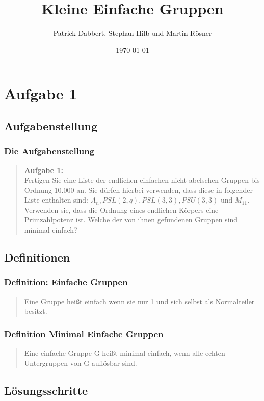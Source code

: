 \documentclass{beamer}
\title{Kleine Einfache Gruppen}
\author{Patrick Dabbert, Stephan Hilb und Martin R\"osner}
\date{\today}
\begin{document}
\begin{frame}
	\titlepage
\end{frame}


\section{Aufgabe 1}
\subsection{Aufgabenstellung}

\begin{frame}
	\frametitle{Die Aufgabenstellung}
	\begin{quote}
	\textbf{Aufgabe 1:}\\
	Fertigen Sie eine Liste der endlichen einfachen nicht-abelschen Gruppen bis Ordnung 10.000 an.
	Sie dürfen hierbei verwenden, dass diese in folgender Liste enthalten sind: $A_n, PSL(2,q), PSL(3,3),
	PSU(3,3)$ und $M_{11}$. Verwenden sie, dass die Ordnung eines endlichen Körpers eine Primzahlpotenz ist.
	Welche der von ihnen gefundenen Gruppen sind minimal einfach?
		 
	\end{quote}
\end{frame}

\subsection{Definitionen}


\begin{frame}
	\frametitle{Definition: Einfache Gruppen}
	\begin{quote}
	 Eine Gruppe heißt einfach wenn sie nur 1 und sich selbst als Normalteiler besitzt.
		 
	\end{quote}
\end{frame}
\begin{frame}
	\frametitle{Definition Minimal Einfache Gruppen}
	\begin{quote}
	 Eine einfache Gruppe G heißt minimal einfach, wenn alle echten Untergruppen von G auflösbar sind.
	\end{quote}
\end{frame}

\subsection{Lösungsschritte}
\end{document}
